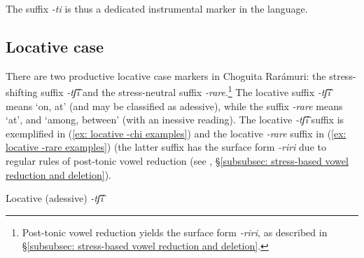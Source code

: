 \z

The suffix \textit{-ti} is thus a dedicated instrumental marker in the language.

\subsection{Locative case}
\label{subsec: locative case}

There are two productive locative case markers in Choguita Rarámuri: the stress-shifting suffix \textit{{}-tʃ͡í} and the stress-neutral suffix \textit{-rare}.\footnote{Post-tonic vowel reduction yields the surface form \textit{-riri}, as described in §\ref{subsubsec: stress-based vowel reduction and deletion}.} The locative suffix \textit{-tʃ͡í} means `on, at’ (and may be classified as adessive), while the suffix \textit{-rare} means ‘at’, and ‘among, between’ (with an inessive reading). The locative \textit{-tʃ͡i} suffix is exemplified in (\ref{ex: locative -chi examples}) and the locative \textit{-rare} suffix in (\ref{ex: locative -rare examples}) (the latter suffix has the surface form \textit{-riri} due to regular rules of post-tonic vowel reduction (see , §\ref{subsubsec: stress-based vowel reduction and deletion}).

\ea\label{ex: locative -chi examples}
{Locative (adessive) \textit{-tʃ͡í}}

